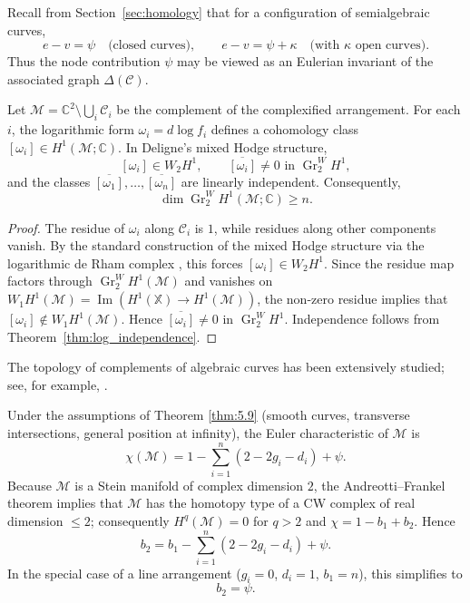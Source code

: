 \documentclass[article,11pt]{amsart} \numberwithin{equation}{section}
\numberwithin{equation}{section}
\begin{document}
{Recall from Section~\ref{sec:homology} that for a configuration of semialgebraic curves,
\[
e - v = \psi \quad \text{(closed curves)},\qquad 
e - v = \psi + \kappa \quad \text{(with }\kappa\text{ open curves)}.
\]
Thus the node contribution $\psi$ may be viewed as an Eulerian invariant of the associated graph $\Delta(\mathcal C)$.

\begin{inp}
	\label{prop:log_into_W2}
	Let $\mathcal M = \mathbb C^2 \setminus \bigcup_i \mathscr{C}_i$ be the complement of the complexified arrangement. For each $i$, the logarithmic form $\omega_i = d\log f_i$ defines a cohomology class $[\omega_i]\in H^1(\mathcal M;\mathbb C)$. In Deligne's mixed Hodge structure,
	\[
	[\omega_i] \in W_2 H^1,\qquad \overline{[\omega_i]}\neq 0 \text{ in } \operatorname{Gr}_2^W H^1,
	\]
	and the classes $\overline{[\omega_1]},\dots,\overline{[\omega_n]}$ are linearly independent. Consequently,
	\[
	\dim \operatorname{Gr}_2^W H^1(\mathcal M;\mathbb C) \ge n.
	\]
\end{inp}

\begin{proof}
	The residue of $\omega_i$ along $\mathscr{C}_i$ is $1$, while residues along other components vanish. By the standard construction of the mixed Hodge structure via the logarithmic de Rham complex \cite{Deligne71, Deligne74, Saito80}, this forces $[\omega_i]\in W_2 H^1$. Since the residue map factors through $\operatorname{Gr}_2^W H^1(\mathcal M)$ and vanishes on $W_1 H^1(\mathcal M) = \operatorname{Im}(H^1(\mathbb X)\longrightarrow H^1(\mathcal M))$, the non-zero residue implies that $[\omega_i]\notin W_1 H^1(\mathcal M)$. Hence $\overline{[\omega_i]}\neq 0$ in $\operatorname{Gr}_2^W H^1$. Independence follows from Theorem~\ref{thm:log_independence}.
\end{proof}

The topology of complements of algebraic curves has been extensively studied; see, for example, \cite{LeWeber76, dimca}.


\begin{thm}
	\label{thm:psi_in_euler}
	Under the assumptions of Theorem \ref{thm:5.9} (smooth curves, transverse intersections, general position at infinity), the Euler characteristic of $\mathcal M$ is
	\[
	\chi(\mathcal M) = 1 - \sum_{i=1}^n (2-2g_i-d_i) + \psi.
	\]
	Because $\mathcal M$ is a Stein manifold of complex dimension $2$, the Andreotti–Frankel theorem \cite{AndreottiFrankel59} implies that $\mathcal M$ has the homotopy type of a CW complex of real dimension $\le 2$; consequently $H^q(\mathcal M)=0$ for $q>2$ and $\chi = 1 - b_1 + b_2$. Hence
	\[
	b_2 = b_1 - \sum_{i=1}^n (2-2g_i-d_i) + \psi.
	\]
	In the special case of a line arrangement ($g_i=0$, $d_i=1$, $b_1=n$), this simplifies to
	\[
	b_2 = \psi.
	\]
\end{thm}

}
\end{document}
